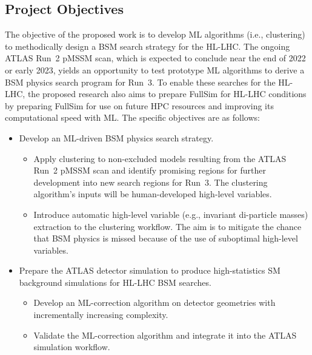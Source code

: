 \documentclass[letter, USenglish, 11pt, subfigure]{article}
\begin{document}


\subsection*{Project Objectives}
The objective of the proposed work is to develop ML algorithms (i.e., clustering) to methodically design a BSM search strategy for the HL-LHC. The ongoing ATLAS Run~2 pMSSM scan, which is expected to conclude near the end of 2022 or early 2023, yields an opportunity to test prototype ML algorithms to derive a BSM physics search program for Run~3. To enable these searches for the HL-LHC, the proposed research also aims to prepare FullSim for HL-LHC conditions by preparing FullSim for use on future HPC resources and improving its computational speed with ML. The specific objectives are as follows:
\begin{itemize}
\item Develop an ML-driven BSM physics search strategy.
  \begin{itemize}
  \item Apply clustering to non-excluded models resulting from the ATLAS Run~2 pMSSM scan and identify promising regions for further development into new search regions for Run~3. The clustering algorithm's inputs will be human-developed high-level variables. 
  \item Introduce automatic high-level variable (e.g., invariant di-particle masses) extraction to the clustering workflow. The aim is to mitigate the chance that BSM physics is missed because of the use of suboptimal high-level variables. 
  \end{itemize}
  \vspace{1in}
\item Prepare the ATLAS detector simulation to produce high-statistics SM background simulations for HL-LHC BSM searches.
  \begin{itemize}
  \item Develop an ML-correction algorithm on detector geometries with incrementally increasing complexity.
  \item Validate the ML-correction algorithm and integrate it into the ATLAS simulation workflow.
  \end{itemize}
\end{itemize}
\end{document}
